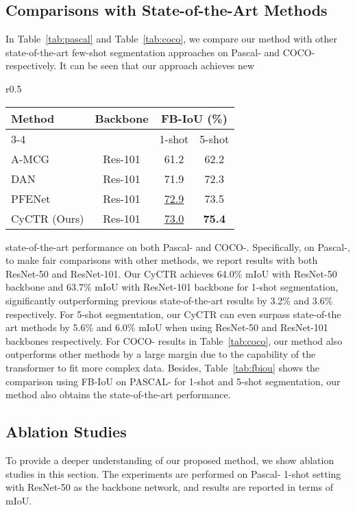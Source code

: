 \documentclass{article}
\begin{document}
\subsection{Comparisons with State-of-the-Art Methods}
In Table~\ref{tab:pascal} and Table~\ref{tab:coco}, we compare our method with other state-of-the-art few-shot segmentation approaches on Pascal- and COCO- respectively. It can be seen that our approach achieves new 
\begin{wraptable}{r}{0.5\textwidth}
	\centering
	\vspace{-0.5mm}
	\caption{Comparison with other methods using FB-IoU (\%) on Pascal- for 1-shot and 5-shot segmentation. }
	\label{tab:fbiou}
	\begin{tabular}{lccc}
		\hline
		\multirow{2}{*}{Method} &\multirow{2}{*}{Backbone}& \multicolumn{2}{c}{FB-IoU (\%)} \\ \cline{3-4} 
		&& 1-shot         & 5-shot         \\ \hline
		A-MCG ~\cite{hu2019A-MCG}&Res-101& 61.2 & 62.2\\
		DAN~\cite{cao2020dan} & Res-101 & 71.9 & 72.3\\
		PFENet ~\cite{tian2020pfenet} &Res-101& \underline{72.9} & 73.5 \\ \hline  
		CyCTR (Ours) & Res-101 & \underline{73.0} & \textbf{75.4} \\ \hline
	\end{tabular}
\end{wraptable}
state-of-the-art performance on both Pascal- and COCO-. 
Specifically, on Pascal-, to make fair comparisons with other methods, we report results with both ResNet-50 and ResNet-101. Our CyCTR achieves 64.0\% mIoU with ResNet-50 backbone and 63.7\% mIoU with ResNet-101 backbone for 1-shot segmentation, significantly outperforming previous state-of-the-art results by 3.2\% and 3.6\% respectively. For 5-shot segmentation, our CyCTR can even surpass state-of-the art methods by 5.6\% and 6.0\% mIoU when using ResNet-50 and ResNet-101 backbones respectively. For COCO- results in Table~\ref{tab:coco}, our method also outperforms other methods by a large margin due to the capability of the transformer to fit more complex data. Besides, Table~\ref{tab:fbiou} shows the comparison using FB-IoU on PASCAL- for 1-shot and 5-shot segmentation, our method also obtains the state-of-the-art performance. 



\subsection{Ablation Studies}
To provide a deeper understanding of our proposed method, we show ablation studies in this section. The experiments are performed on Pascal- 1-shot setting with ResNet-50 as the backbone network, and results are reported in terms of mIoU. 
 
\end{document}
